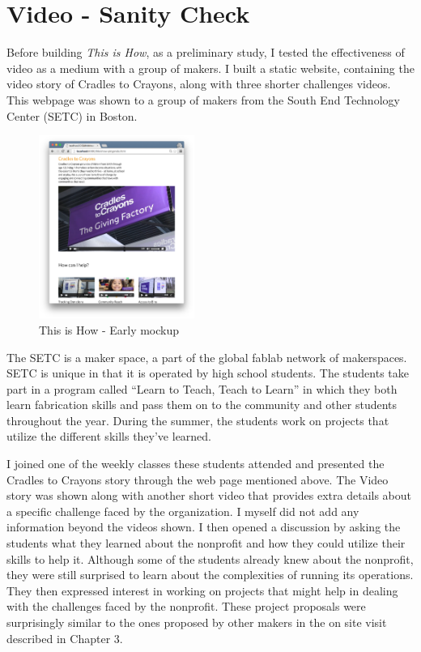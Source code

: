 \section {Video - Sanity Check}

Before building \textit{This is How}, as a preliminary study, I tested the effectiveness of video as a medium with a group of makers. I built a static website, containing the video story of Cradles to Crayons, along with three shorter challenges videos. This webpage was shown to a group of makers from the South End Technology Center (SETC) in Boston.

   \begin{figure}[thpb]
      \centering
      \includegraphics[width=2in]{figures/thisishow-mockup.png}
      \caption{This is How - Early mockup}
      \label{fig_thisishow_mockup}
   \end{figure}

The SETC is a maker space, a part of the global fablab \cite{fablab} network of maker­spaces. SETC is unique in that it is operated by high school students. The students take part in a program called ``Learn to Teach, Teach to Learn'' in which they both learn fabrication skills and pass them on to the community and other students throughout the year. During the summer, the students work on projects that utilize the different skills they've learned.

I joined one of the weekly classes these students attended and presented the Cradles to Crayons story through the web page mentioned above. The Video story was shown along with another short video that provides extra details about a specific challenge faced by the organization. I myself did not add any information beyond the videos shown. I then opened a discussion by asking the students what they learned about the nonprofit and how they could utilize their skills to help it. Although some of the students already knew about the nonprofit, they were still surprised to learn about the complexities of running its operations. They then expressed interest in working on projects that might help in dealing with the challenges faced by the nonprofit. These project proposals were surprisingly similar to the ones proposed by other makers in the on site visit described in Chapter 3.


